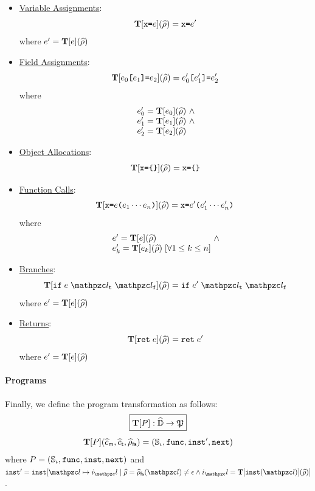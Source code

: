 \begin{itemize}
  \item \underline{Variable Assignments}:
    \[
      \textbf{T}[\texttt{x} \texttt{=} e](\widehat{\rho}) =
      \texttt{x} \texttt{=} e'
    \]
    where $e' = \textbf{T}[e](\widehat{\rho})$

  \item \underline{Field Assignments}:
    \[
      \textbf{T}[e_0 \texttt{[} e_1 \texttt{]} \texttt{=} e_2](\widehat{\rho}) =
      e'_0 \texttt{[} e'_1 \texttt{]} \texttt{=} e'_2
    \]
    where
    \[
      \begin{array}{l@{~}c@{~}ll}
        \expr'_0 = \transform{\expr_0}(\aenv) &\wedge\\
        \expr'_1 = \transform{\expr_1}(\aenv) &\wedge\\
        \expr'_2 = \transform{\expr_2}(\aenv)\\
      \end{array}
    \]
  \item \underline{Object Allocations}:
    \[
      \textbf{T}[\texttt{x} \texttt{=} \texttt{\{} \texttt{\}}](\widehat{\rho}) =
      \texttt{x} \texttt{=} \texttt{\{} \texttt{\}}
    \]

  \item \underline{Function Calls}:
    \[
      \textbf{T}[\texttt{x} \texttt{=} e \texttt{(} e_1 \cdots e_n \texttt{)}](\widehat{\rho}) =
      \texttt{x} \texttt{=} e' \texttt{(} e'_1 \cdots e'_n \texttt{)}
    \]
    where
    \[
      \begin{array}{l@{~}c@{~}ll}
        \expr' = \transform{\expr}(\aenv) &\wedge\\
        \expr'_k = \transform{\expr_k}(\aenv) \; [\forall 1 \leq k \leq
        n]\\
      \end{array}
    \]

  \item \underline{Branches}:
    \[
      \transform{\kwif \; \expr \; \lab_\vart \; \lab_\varf}(\aenv) =
      \kwif \; \expr' \; \lab_\vart \; \lab_\varf
    \]
    where $e' = \textbf{T}[e](\widehat{\rho})$

  \item \underline{Returns}:
    \[
      \textbf{T}[\texttt{ret} \; e](\widehat{\rho}) =
      \texttt{ret} \; e'
    \]
    where $e' = \textbf{T}[e](\widehat{\rho})$
\end{itemize}

\paragraph{Programs} Finally, we define the program transformation as follows:
\[
  \framebox{$\transform{\prog}: \aelemset \rightarrow \progset$}
\]
\[
  \textbf{T}[P](\widehat{c}_{\textsf{m}}, \widehat{c}_{\textsf{t}}, \widehat{\rho}_{\textsf{fs}}) = (\mathbb{S}_\iota, \texttt{func}, \texttt{inst}',
  \texttt{next})
\]
where $P = (\mathbb{S}_\iota, \texttt{func}, \texttt{inst}, \texttt{next})$ and $\getinst' =
\getinst[\lab \mapsto \inst_\lab \mid \aenv = \afsenv(\lab) \neq \epsilon \wedge
\inst_\lab = \transform{\getinst(\lab)}(\aenv)]$.



